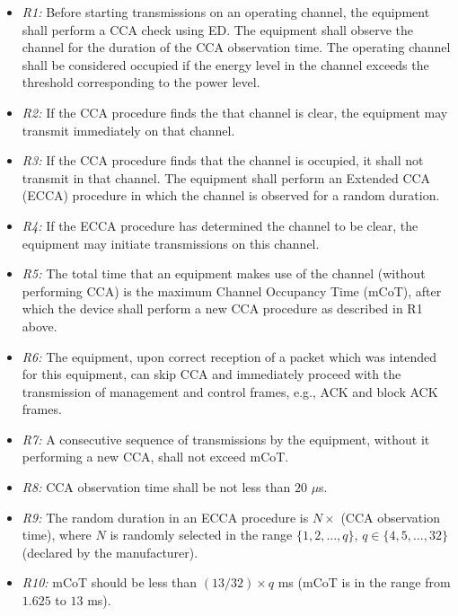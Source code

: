 \begin{itemize}
	
	\item
	\textit{R1:} Before starting transmissions on an operating channel, the equipment shall perform a CCA check using ED. The equipment shall observe the channel for the duration of the CCA observation time. The operating channel shall be considered occupied if the energy level in the channel exceeds the threshold corresponding to the power level.
	
	\item
	\textit{R2:}
	If the CCA procedure finds the that channel is clear, the equipment may transmit immediately on that channel.
	
	\item
	\textit{R3:}
	If the CCA procedure finds that the channel is occupied, it shall not transmit in that channel. The equipment shall perform an Extended CCA (ECCA) procedure in which the channel is observed for a random duration.
	
	\item
	\textit{R4:}
	If the ECCA procedure has determined the channel to be clear, the equipment may initiate transmissions on this channel.
	
	\item
	\textit{R5:}
	The total time that an equipment makes use of the channel (without performing CCA) is the maximum Channel Occupancy Time (mCoT), after which the device shall perform a new CCA procedure as described in R1 above.
	
	\item
	\textit{R6:}
	The equipment, upon correct reception of a packet which was intended for this equipment, can skip CCA and immediately proceed with the transmission of management and control frames, e.g., ACK and block ACK frames.
	
	\item
	\textit{R7:}
	A consecutive sequence of transmissions by the equipment, without it performing a new CCA, shall not exceed mCoT.
	
	\item
	\textit{R8:}
	CCA observation time shall be not less than $20$ $\mu$s.
	
	\item
	\textit{R9:}
	The random duration in an ECCA procedure is $N \times$ (CCA observation time), where $N$ is randomly selected in the range $\{1,2,...,q\}$, $q \in \{4,5,...,32\}$ (declared by the manufacturer).
	
	\item
	\textit{R10:}
	mCoT should be less than $(13/32)\times q$ ms (mCoT is in the range from $1.625$ to $13$ ms).
	
\end{itemize}

